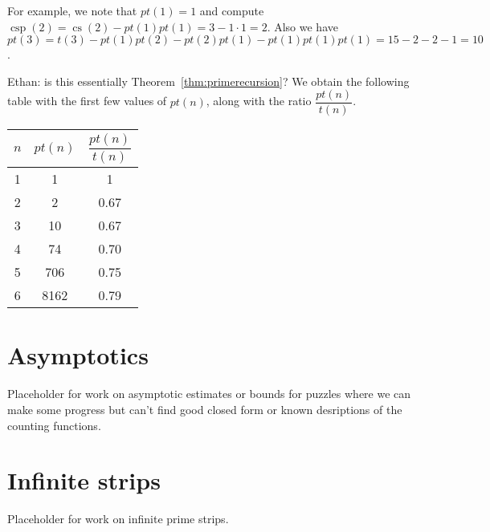 \documentclass[10pt]{article}
\numberwithin{equation}{section}
\DeclareMathOperator{\cs}{cs} %
\DeclareMathOperator{\csp}{csp} %
\newenvironment{anote}
               {{\textcolor{blue}{Note:}}
                 \itshape
               }
               {}
\begin{document}
For example, we note that $pt(1) =1$ and compute $\csp(2) = \cs(2) -pt(1)pt(1) = 3 - 1 \cdot 1 = 2$. Also we have $pt(3) = t(3) - pt(1)pt(2) - pt(2)pt(1) - pt(1)pt(1)pt(1) = 15 - 2 - 2- 1 = 10$.

\begin{anote}
Ethan: is this essentially Theorem~\ref{thm:primerecursion}?
\end{anote}
We obtain the following table with the first few values of $pt(n)$, along with the ratio $\dfrac{pt(n)}{t(n)}$.

\begin{center}
\begin{tabular}{ |c|c|c| } 
 \hline
 $n$ & $pt(n) $ & $\dfrac{pt(n)}{t(n)}$ \\ 
 \hline
 1 & 1 & 1 \\ 
 2 & 2 & 0.67 \\ 
 3 & 10 & 0.67 \\ 
 4 & 74 & 0.70 \\ 
 5 & 706 & 0.75 \\ 
6 & 8162 & 0.79 \\ 
 \hline
\end{tabular}
\end{center}

\section{Asymptotics}

\begin{anote}
Placeholder for work on asymptotic estimates or bounds for puzzles where we can make some progress but can't find  good closed form or known desriptions of the counting functions.
\end{anote}

\section{Infinite strips}

\begin{anote}
Placeholder for work on infinite prime strips.
\end{anote}
%
\end{document}
